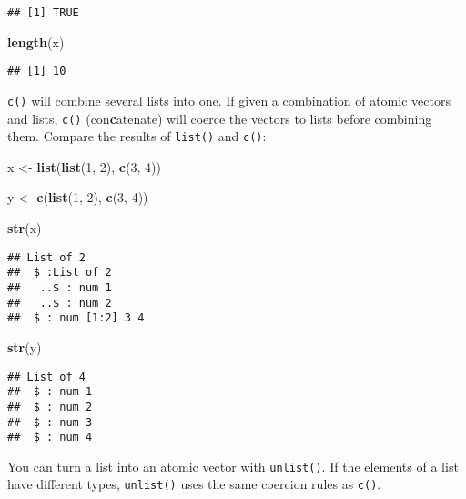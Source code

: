 \documentclass[
]{book}
\newenvironment{Shaded}{\begin{snugshade}}{\end{snugshade}}
\newcommand{\DecValTok}[1]{\textcolor[rgb]{0.00,0.00,0.81}{#1}}
\newcommand{\KeywordTok}[1]{\textcolor[rgb]{0.13,0.29,0.53}{\textbf{#1}}}
\newcommand{\NormalTok}[1]{#1}
\newcommand{\StringTok}[1]{\textcolor[rgb]{0.31,0.60,0.02}{#1}}
\begin{document}
\begin{verbatim}
## [1] TRUE
\end{verbatim}

\begin{Shaded}
\begin{Highlighting}[]
\KeywordTok{length}\NormalTok{(x)}
\end{Highlighting}
\end{Shaded}

\begin{verbatim}
## [1] 10
\end{verbatim}

\texttt{c()} will combine several lists into one. If given a combination of atomic vectors and lists, \texttt{c()} (con\textbf{c}atenate) will coerce the vectors to lists before combining them. Compare the results of \texttt{list()} and \texttt{c()}:

\begin{Shaded}
\begin{Highlighting}[]
\NormalTok{x \textless{}{-}}\StringTok{ }\KeywordTok{list}\NormalTok{(}\KeywordTok{list}\NormalTok{(}\DecValTok{1}\NormalTok{, }\DecValTok{2}\NormalTok{), }\KeywordTok{c}\NormalTok{(}\DecValTok{3}\NormalTok{, }\DecValTok{4}\NormalTok{))}

\NormalTok{y \textless{}{-}}\StringTok{ }\KeywordTok{c}\NormalTok{(}\KeywordTok{list}\NormalTok{(}\DecValTok{1}\NormalTok{, }\DecValTok{2}\NormalTok{), }\KeywordTok{c}\NormalTok{(}\DecValTok{3}\NormalTok{, }\DecValTok{4}\NormalTok{))}

\KeywordTok{str}\NormalTok{(x)}
\end{Highlighting}
\end{Shaded}

\begin{verbatim}
## List of 2
##  $ :List of 2
##   ..$ : num 1
##   ..$ : num 2
##  $ : num [1:2] 3 4
\end{verbatim}

\begin{Shaded}
\begin{Highlighting}[]
\KeywordTok{str}\NormalTok{(y)}
\end{Highlighting}
\end{Shaded}

\begin{verbatim}
## List of 4
##  $ : num 1
##  $ : num 2
##  $ : num 3
##  $ : num 4
\end{verbatim}

You can turn a list into an atomic vector with \texttt{unlist()}. If the elements of a list have different types, \texttt{unlist()} uses the same coercion rules as \texttt{c()}.
\end{document}
